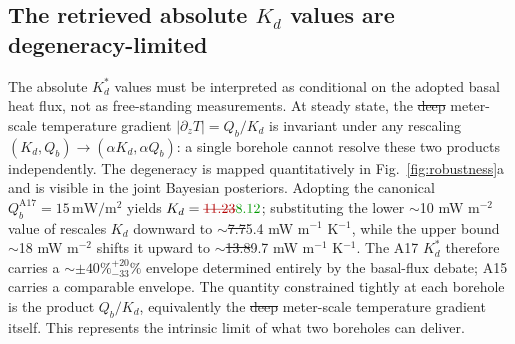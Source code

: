 \documentclass[11pt]{article}
\makeatletter
\let\sout@orig\sout
\renewcommand{\sout}[1]{\ifmmode\text{\sout@orig{\ensuremath{#1}}}\else\sout@orig{#1}\fi}
\newcommand{\new}[1]{\textcolor{green!60!black}{#1}}
\newcommand{\old}[1]{\textcolor{red!70!black}{\sout{#1}}}
\newcommand{\new}[1]{\textcolor{green!60!black}{#1}}
\newcommand{\old}[1]{}
\newcommand{\new}[1]{#1}
\newcommand{\old}[1]{}
\makeatother
\begin{document}
\subsection{The retrieved absolute $K_d$ values are degeneracy-limited}%
\label{sec:disc-degeneracy}
The absolute $K_d^{*}$ values must be interpreted as conditional on the
adopted basal heat flux, not as free-standing measurements. At steady
state, the \old{deep }\new{meter-scale temperature }gradient
$|\partial_z T|=Q_b/K_d$ is invariant under any rescaling
$(K_d,Q_b)\!\to\!(\alpha K_d,\alpha Q_b)$: a single borehole cannot resolve
these two products independently. The degeneracy is mapped quantitatively
in Fig.~\ref{fig:robustness}a and is visible in the joint Bayesian
posteriors. Adopting the canonical
$Q_b^{\mathrm{A17}}=15\,\si{\milli\watt\per\meter\squared}$
\citep{langseth1976,nagihara2018} yields $K_d=\old{11.23}\new{8.12}$;
substituting the
lower $\sim$10 mW m$^{-2}$ value of \citet{saito2007,nagihara2018} rescales
$K_d$ downward to $\sim$\old{7.7}\new{5.4} mW m$^{-1}$ K$^{-1}$, while
the upper bound
$\sim$18 mW m$^{-2}$ shifts it upward to
$\sim$\old{13.8}\new{9.7} mW m$^{-1}$ K$^{-1}$.
The A17 $K_d^{*}$ therefore carries a
$\sim$\old{$\pm 40\%$}\new{$^{+20}_{-33}\%$} envelope determined
entirely by the basal-flux debate; A15 carries a comparable envelope. The
quantity constrained tightly at each borehole is the product $Q_b/K_d$,
equivalently the \old{deep }\new{meter-scale temperature }gradient itself.
This represents the intrinsic limit of what two boreholes can deliver.
\end{document}
